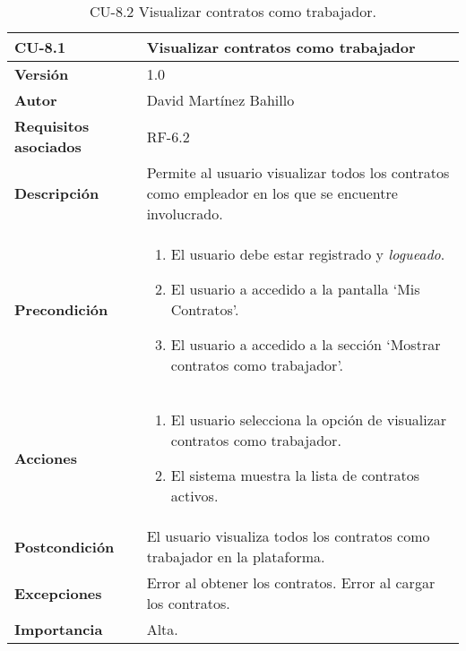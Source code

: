 \begin{table}[p]
	\centering
	\begin{tabularx}{\linewidth}{ p{} p{} }
		\toprule
		\textbf{CU-8.1}  & \textbf{Visualizar contratos como trabajador}\\
		\midrule
		\textbf{Versión}              & 1.0    \\
		\textbf{Autor}                & David Martínez Bahillo \\
		\textbf{Requisitos asociados} & RF-6.2 \\
		\textbf{Descripción}          & Permite al usuario visualizar todos los contratos como empleador en los que se encuentre involucrado. \\
		\textbf{Precondición}         &  
		\begin{enumerate}
			\def\labelenumi{\arabic{enumi}.}
			\tightlist
			\item El usuario debe estar registrado y \textit{logueado}.
			\item El usuario a accedido a la pantalla `Mis Contratos'.
			\item El usuario a accedido a la sección `Mostrar contratos como trabajador'.
		\end{enumerate}\\
		\textbf{Acciones}             &
		\begin{enumerate}
			\def\labelenumi{\arabic{enumi}.}
			\tightlist
			\item El usuario selecciona la opción de visualizar contratos como trabajador.
			\item El sistema muestra la lista de contratos activos.
		\end{enumerate}\\
		\textbf{Postcondición}        & El usuario visualiza todos los contratos como trabajador en la plataforma. \\
		\textbf{Excepciones}          & Error al obtener los contratos. Error al cargar los contratos. \\
		\textbf{Importancia}          & Alta. \\
		\bottomrule
	\end{tabularx}
	\caption{CU-8.2 Visualizar contratos como trabajador.}
\end{table}


